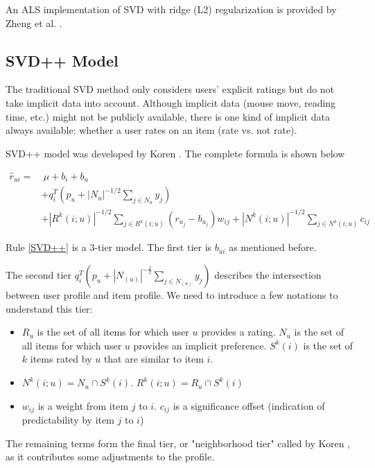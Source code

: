 \documentclass[letter paper, 11pt]{article}
\begin{document}
	An ALS implementation of SVD with ridge (L2) regularization is provided by Zheng et al. \cite{RSVD}.

	\subsection{SVD++ Model}
	
	The traditional SVD method only considers users' explicit ratings but do not take implicit data into account. Although implicit data (mouse move, reading time, etc.) might not be publicly available, there is one kind of implicit data always available: whether a user rates on an item (rate vs. not rate). 
	
	
	SVD++ model was developed by Koren \cite{korenFactorization}. The complete formula is shown below 
	
	\begin{equation} \label{SVD++}
		\begin{split}
			\hat{r}_{ui} =& \ \mu + b_i + b_u \\ 
			& + q_i^T  (p_u + |N_u|^{-1/2} \sum_{j \in N_u}y_j) \\ 
			& + |R^k(i; u)|^{-1/2} \sum_{j \in R^k(i; u)} (r_{u_j} - b_{u_j}) w_{ij} + |N^k(i; u)|^{-1/2} \sum_{j \in N^k(i; u)} c_{ij}
		\end{split}
	\end{equation}
	
	
	Rule \ref{SVD++} is a 3-tier model. The first tier is $b_{ui}$ as mentioned before. 
	
	
	The second tier $q_i^T  (p_u + |N_{(u)}|^{-\frac{1}{2}} \sum_{j \in N_{(u)}}y_j)$ describes the intersection between user profile and item profile. We need to introduce a few notations to understand this tier:
	\begin{itemize}
		\item $R_u$ is the set of all items for which user $u$ provides a rating. $N_u$ is the set of all items for which user $u$ provides an implicit preference. $S^k(i)$ is the set of $k$ items rated by $u$ that are similar to item $i$.
		
		\item $N^k{(i; u)} = N_u \cap S^k (i)$. $R^k{(i; u)} = R_u \cap S^k (i)$
		
		\item $w_{ij}$ is a weight from item $j$ to $i$. $c_{ij}$ is a significance offset (indication of predictability by item $j$ to $i$)
	\end{itemize}
	
	The remaining terms form the final tier, or "neighborhood tier" called by Koren \cite{korenFactorization}, as it contributes some adjustments to the profile.
	
\end{document}
